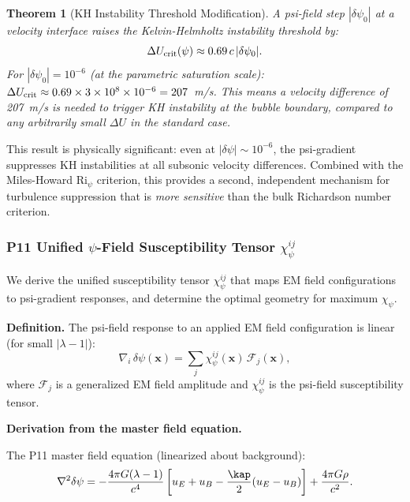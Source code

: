 \documentclass[11pt,twocolumn]{article}
\newcommand{\dpsi}{\delta\psi}
\newcommand{\lam}{\lambda}
\newcommand{\Ri}{\mathrm{Ri}}
\newtheorem{theorem}{Theorem}
\begin{document}
\begin{theorem}[KH Instability Threshold Modification]
\label{thm:kh}
A psi-field step $|\dpsi_0|$ at a velocity interface raises the
Kelvin-Helmholtz instability threshold by:
\begin{equation}
\Delta U_{\rm crit}(\psi) \approx 0.69\,c\,|\dpsi_0|.
\label{eq:kh_theorem}
\end{equation}
For $|\dpsi_0| = 10^{-6}$ (at the parametric saturation scale):
$\Delta U_{\rm crit} \approx 0.69\times3\times10^8\times10^{-6} = 207$~m/s.
This means a velocity difference of 207~m/s is needed to trigger KH
instability at the bubble boundary, compared to any arbitrarily small
$\Delta U$ in the standard case.
\end{theorem}

This result is physically significant: even at $|\dpsi| \sim 10^{-6}$,
the psi-gradient suppresses KH instabilities at all subsonic velocity
differences. Combined with the Miles-Howard $\Ri_\psi$ criterion, this
provides a second, independent mechanism for turbulence suppression that
is \emph{more sensitive} than the bulk Richardson number criterion.

\subsubsection{P11 Unified $\psi$-Field Susceptibility Tensor $\chi_\psi^{ij}$}
\label{sec:susceptibility}

We derive the unified susceptibility tensor $\chi_\psi^{ij}$ that maps
EM field configurations to psi-gradient responses, and determine the
optimal geometry for maximum $\chi_\psi$.

\textbf{Definition.} The psi-field response to an applied EM field
configuration is linear (for small $|\lam-1|$):
\begin{equation}
\nabla_i\,\dpsi(\mathbf{x}) = \sum_j \chi_\psi^{ij}(\mathbf{x})\,
\mathcal{F}_j(\mathbf{x}),
\label{eq:chi_def}
\end{equation}
where $\mathcal{F}_j$ is a generalized EM field amplitude and
$\chi_\psi^{ij}$ is the psi-field susceptibility tensor.

\textbf{Derivation from the master field equation.}

The P11 master field equation (linearized about background):
\begin{equation}
\nabla^2\dpsi = -\frac{4\pi G(\lam-1)}{c^4}
\left[u_E + u_B - \frac{\kap}{2}(u_E - u_B)\right]
+ \frac{4\pi G\rho}{c^2}.
\label{eq:linearized_field}
\end{equation}
\end{document}
